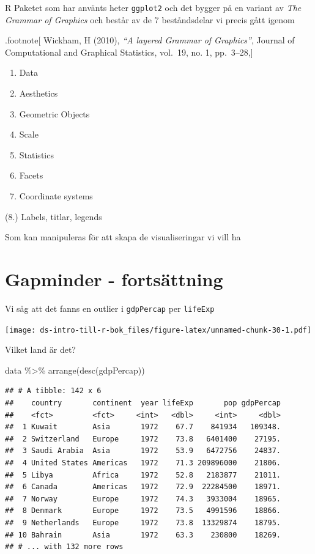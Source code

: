\documentclass[
]{book}
\newenvironment{Shaded}{\begin{snugshade}}{\end{snugshade}}
\newcommand{\FunctionTok}[1]{\textcolor[rgb]{0.00,0.00,0.00}{#1}}
\newcommand{\NormalTok}[1]{#1}
\newcommand{\SpecialCharTok}[1]{\textcolor[rgb]{0.00,0.00,0.00}{#1}}
\begin{document}
R Paketet som har använts heter \texttt{ggplot2} och det bygger på en variant av \emph{The Grammar of Graphics} och består av de 7 beståndsdelar vi precis gått igenom

.footnote{[}
Wickham, H (2010), \emph{``A layered Grammar of Graphics''}, Journal of Computational and Graphical Statistics, vol.~19, no. 1, pp.~3--28,{]}

\begin{enumerate}
\def\labelenumi{\arabic{enumi}.}
\item
  Data
\item
  Aesthetics
\item
  Geometric Objects
\item
  Scale
\item
  Statistics
\item
  Facets
\item
  Coordinate systems
\end{enumerate}

(8.) Labels, titlar, legends

Som kan manipuleras för att skapa de visualiseringar vi vill ha

\hypertarget{gapminder---fortsuxe4ttning}{%
\section{Gapminder - fortsättning}\label{gapminder---fortsuxe4ttning}}

Vi såg att det fanns en outlier i \texttt{gdpPercap} per \texttt{lifeExp}

\texttt{[image: ds-intro-till-r-bok\_files/figure-latex/unnamed-chunk-30-1.pdf]}

Vilket land är det?

\begin{Shaded}
\begin{Highlighting}[]
\NormalTok{data }\SpecialCharTok{\%\textgreater{}\%} \FunctionTok{arrange}\NormalTok{(}\FunctionTok{desc}\NormalTok{(gdpPercap))}
\end{Highlighting}
\end{Shaded}

\begin{verbatim}
## # A tibble: 142 x 6
##    country       continent  year lifeExp       pop gdpPercap
##    <fct>         <fct>     <int>   <dbl>     <int>     <dbl>
##  1 Kuwait        Asia       1972    67.7    841934   109348.
##  2 Switzerland   Europe     1972    73.8   6401400    27195.
##  3 Saudi Arabia  Asia       1972    53.9   6472756    24837.
##  4 United States Americas   1972    71.3 209896000    21806.
##  5 Libya         Africa     1972    52.8   2183877    21011.
##  6 Canada        Americas   1972    72.9  22284500    18971.
##  7 Norway        Europe     1972    74.3   3933004    18965.
##  8 Denmark       Europe     1972    73.5   4991596    18866.
##  9 Netherlands   Europe     1972    73.8  13329874    18795.
## 10 Bahrain       Asia       1972    63.3    230800    18269.
## # ... with 132 more rows
\end{verbatim}
\end{document}
